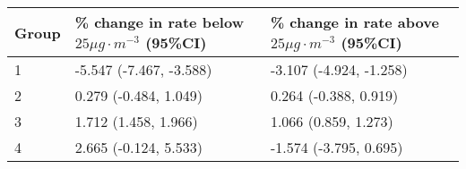 \begin{tabular}{lll}
  \hline
Group & \% change in rate below $25 \mu g \cdot m^{-3}$ (95\%CI) & \% change in rate above $25 \mu g \cdot m^{-3}$ (95\%CI) \\ 
  \hline
   1 & -5.547 (-7.467, -3.588) & -3.107 (-4.924, -1.258) \\ 
     2 & 0.279 (-0.484, 1.049) & 0.264 (-0.388, 0.919) \\ 
     3 & 1.712 (1.458, 1.966) & 1.066 (0.859, 1.273) \\ 
     4 & 2.665 (-0.124, 5.533) & -1.574 (-3.795, 0.695) \\ 
   \hline
\end{tabular}

